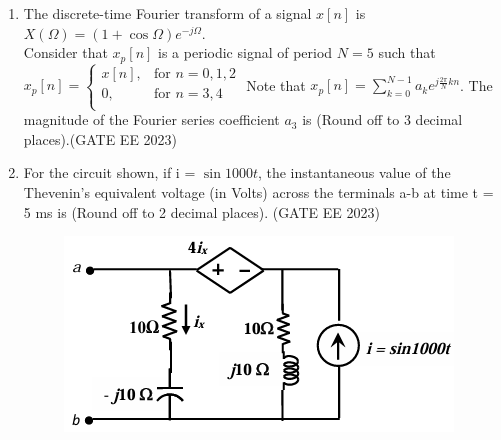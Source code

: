 \documentclass[a4paper,12pt]{exam}
\theoremstyle{remark}
\begin{document}
\begin{enumerate}
\item The discrete-time Fourier transform of a signal $x[n]$ is $X(\Omega) = (1 + \cos \Omega) e^{-j\Omega}$.\\
Consider that $x_p[n]$ is a periodic signal of period $N=5$ such that
$
x_p[n] = 
\begin{cases}
x[n], & \text{for } n=0,1,2 \\
0, & \text{for } n=3,4 \\
\end{cases}
$
Note that $x_p[n] = \sum_{k=0}^{N-1} a_k e^{j \frac{2\pi}{N} k n}$. The magnitude of the Fourier series coefficient $a_3$ is \underline{\hspace{2cm}} (Round off to 3 decimal places).\hfill{(GATE EE 2023)}
\item For the circuit shown, if i = $\sin 1000t$, the instantaneous value of the Thevenin’s 
equivalent voltage (in Volts) across the terminals a-b at time t = 5 ms is \underline{\hspace{2cm}}
(Round off to 2 decimal places). \hfill{(GATE EE 2023)}

\begin{figure}[H]
    \centering
    \includegraphics[width=0.5 \columnwidth]{figs/Q 51.png}
    \caption{}
    \label{fig:placeholder}
\end{figure}


\end{enumerate}
\end{document}
